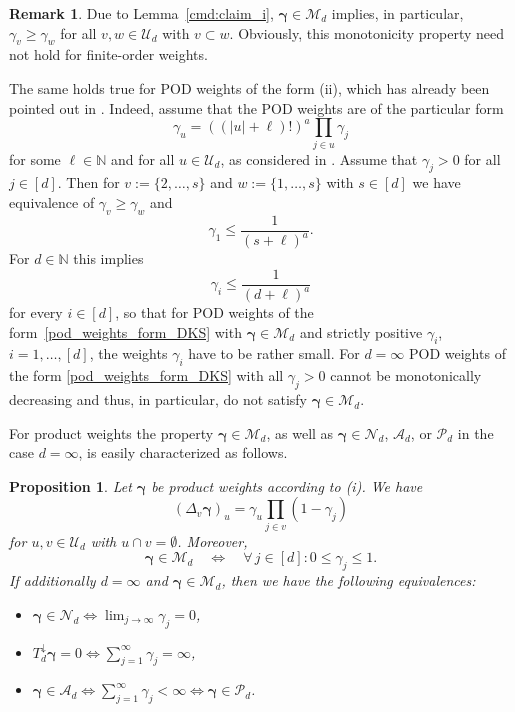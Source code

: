 \documentclass{article}
\newcommand{\N}  {{\mathbb N}}
\newcommand{\bg}{{\boldsymbol{\gamma}}}
\newcommand{\PP} {\mathcal{P}}
\newcommand{\U}  {\mathcal{U}}
\newcommand{\M}  {\mathcal{M}}
\newcommand{\mN}  {\mathcal{N}}
\newcommand{\A}{\mathcal{A}}
\newcommand{\lo}{\downarrow}
\theoremstyle{plain}
\newtheorem{prop}{Proposition}
\theoremstyle{definition}
\newtheorem{rem}{Remark}
\begin{document}
\begin{rem}
Due to Lemma~\ref{cmd:claim_i}, $\bg \in \M_d$ implies, in particular, 
$\gamma_v \geq \gamma_w$ for all $v,w\in \U_d$ with $v \subset w$.
Obviously, this monotonicity property need not hold for 
finite-order weights. 

The same holds true for POD weights of the form (ii),
which has already been pointed out in \citet{DKS13}.
Indeed, assume that the POD weights are of the particular form
\begin{equation}\label{pod_weights_form_DKS}
\gamma_u = \left((|u|+\ell)!\right)^a  \prod_{j\in u} \gamma_j
\end{equation}
for some $\ell \in \N$ and for all $u \in \U_d$,
as considered in \citet[p.~208]{DKS13}.
Assume that $\gamma_j >0$ for all $j\in[d]$. Then
for $v := \{2,\dots,s\}$ and $w := \{1,\dots,s\}$
with $s \in [d]$  we have equivalence of 
$\gamma_v \geq \gamma_w$ and
\[
\gamma_1 \leq \frac{1}{\left(s+\ell \right)^a}.
\]
For $d \in \N$ this implies 
\[
\gamma_i \leq \frac{1}{\left(d+\ell \right)^a}
\]
for every $i \in [d]$, so that for POD weights of the 
form~\eqref{pod_weights_form_DKS} with $\bg \in \M_d$ 
and strictly positive $\gamma_i$, $i=1,\ldots, [d]$, the weights 
$\gamma_i$ have to be rather small. For $d = \infty$
POD weights of the form \eqref{pod_weights_form_DKS} with all 
$\gamma_j >0$ cannot be monotonically
decreasing and thus, in particular, 
do not satisfy $\bg\in\M_d$.   
\end{rem}

For product weights the property $\bg \in \M_d$,
as well as $\bg \in \mN_d$, $\A_d$, or $\PP_d$ in the case
$d=\infty$,
is easily characterized as follows.

\begin{prop}\label{l5}
Let $\bg$ be product weights according to (i). We have 
\begin{equation}\label{eq:diff_prod_weights}
\left(\Delta_v \bg\right)_u 
= \gamma_{u} \prod_{j\in v} (1 - \gamma_{j})
\end{equation}
for $u, v\in \U_d$ with $u\cap v = \emptyset$.
Moreover,
\begin{equation}\label{char_prod_weights_M_d}
\bg \in \M_d \quad \Leftrightarrow \quad 
\forall\, j \in [d] \colon 0 \leq \gamma_j \leq 1.
\end{equation}
If additionally $d=\infty$ and $\bg \in \M_d$, then we have the 
following equivalences:
\begin{itemize}
\item[{\rm (}a{\rm )}] 
$\bg \in \mN_d \Leftrightarrow \lim_{j\to \infty} \gamma_j = 0$,
\item[{\rm (}b{\rm )}] 
$T^\lo_d \bg = 0 \Leftrightarrow \sum_{j=1}^\infty \gamma_j = \infty$,
\item[{\rm (}c{\rm )}] 
$\bg \in \A_d \Leftrightarrow 
\sum_{j=1}^\infty \gamma_j <  \infty
\Leftrightarrow \bg \in \PP_d$. 
\end{itemize}
\end{prop}
\end{document}
